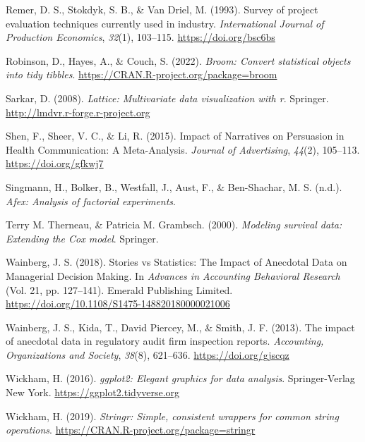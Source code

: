 \documentclass[
  man, donotrepeattitle,floatsintext]{apa7}
\newlength{\cslhangindent}
\newlength{\cslentryspacingunit} %
\newenvironment{CSLReferences}[2] %
 {%
  \setlength{\parindent}{0pt}
  \ifodd #1
  \let\oldpar\par
  \def\par{\hangindent=\cslhangindent\oldpar}
  \fi
  \setlength{\parskip}{#2\cslentryspacingunit}
 }%
 {}
\theoremstyle{definition}
\theoremstyle{definition}
\theoremstyle{definition}
\theoremstyle{definition}
\theoremstyle{remark}
\begin{document}
\begin{CSLReferences}{1}{0}
\leavevmode{}%
Remer, D. S., Stokdyk, S. B., \& Van Driel, M. (1993). Survey of project evaluation techniques currently used in industry. \emph{International Journal of Production Economics}, \emph{32}(1), 103--115. \url{https://doi.org/bsc6bs}

\leavevmode{}%
Robinson, D., Hayes, A., \& Couch, S. (2022). \emph{Broom: Convert statistical objects into tidy tibbles}. \url{https://CRAN.R-project.org/package=broom}

\leavevmode{}%
Sarkar, D. (2008). \emph{Lattice: Multivariate data visualization with r}. Springer. \url{http://lmdvr.r-forge.r-project.org}

\leavevmode{}%
Shen, F., Sheer, V. C., \& Li, R. (2015). Impact of {Narratives} on {Persuasion} in {Health Communication}: {A Meta-Analysis}. \emph{Journal of Advertising}, \emph{44}(2), 105--113. \url{https://doi.org/gfkwj7}

\leavevmode{}%
Singmann, H., Bolker, B., Westfall, J., Aust, F., \& Ben-Shachar, M. S. (n.d.). \emph{Afex: Analysis of factorial experiments}.

\leavevmode{}%
Terry M. Therneau, \& Patricia M. Grambsch. (2000). \emph{Modeling survival data: Extending the {C}ox model}. Springer.

\leavevmode{}%
Wainberg, J. S. (2018). Stories vs {Statistics}: {The Impact} of {Anecdotal Data} on {Managerial Decision Making}. In \emph{Advances in {Accounting Behavioral Research}} (Vol. 21, pp. 127--141). {Emerald Publishing Limited}. \url{https://doi.org/10.1108/S1475-148820180000021006}

\leavevmode{}%
Wainberg, J. S., Kida, T., David Piercey, M., \& Smith, J. F. (2013). The impact of anecdotal data in regulatory audit firm inspection reports. \emph{Accounting, Organizations and Society}, \emph{38}(8), 621--636. \url{https://doi.org/gjscqz}

\leavevmode{}%
Wickham, H. (2016). \emph{ggplot2: Elegant graphics for data analysis}. Springer-Verlag New York. \url{https://ggplot2.tidyverse.org}

\leavevmode{}%
Wickham, H. (2019). \emph{Stringr: Simple, consistent wrappers for common string operations}. \url{https://CRAN.R-project.org/package=stringr}


\end{CSLReferences}
\end{document}
